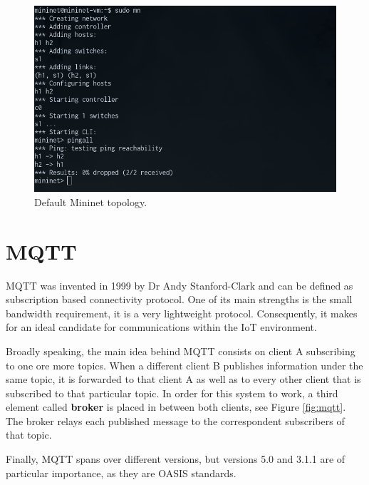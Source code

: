 \begin{figure}
  \centering
  \includegraphics[width=\linewidth]{imagenes/Technologies/mininet_default_topology.png}
  \caption{Default Mininet topology.}
  \label{fig:mininet_default}
\end{figure}

\section{MQTT}
MQTT\cite{mqtt_specfication} was invented in 1999 by Dr Andy Stanford-Clark and can be defined as subscription based connectivity protocol. One of its main strengths is the small bandwidth requirement, it is a very lightweight protocol. Consequently, it makes for an ideal candidate for communications within the IoT environment.

Broadly speaking, the main idea behind MQTT consists on client A subscribing to one ore more topics. When a different client B publishes information under the same topic, it is forwarded to that client A as well as to every other client that is subscribed to that particular topic. In order for this system to work, a third element called \textbf{broker} is placed in between both clients, see Figure \ref{fig:mqtt}. The broker relays each published message to the correspondent subscribers of that topic.

Finally, MQTT spans over different versions, but versions 5.0 and 3.1.1 are of particular importance, as they are OASIS standards.

